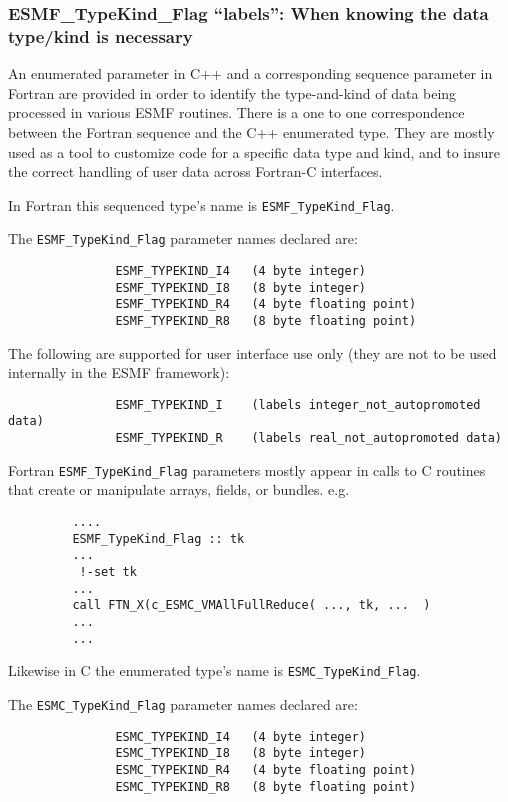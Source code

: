 \subsubsection{ESMF\_TypeKind\_Flag ``labels'': When knowing the data type/kind is necessary}

An enumerated parameter in C++ and a corresponding sequence parameter in Fortran are provided in order to identify the type-and-kind of data being processed in various ESMF routines. There is a one to one correspondence between the Fortran sequence and the C++ enumerated type. They are mostly used as a tool to customize code for a specific data type and kind, and to insure the correct handling of user data across Fortran-C interfaces.

In Fortran this sequenced type's name is {\tt ESMF\_TypeKind\_Flag}.

The {\tt ESMF\_TypeKind\_Flag} parameter names declared are:

\begin{verbatim}
               ESMF_TYPEKIND_I4   (4 byte integer)
               ESMF_TYPEKIND_I8   (8 byte integer)
               ESMF_TYPEKIND_R4   (4 byte floating point)
               ESMF_TYPEKIND_R8   (8 byte floating point)
\end{verbatim}

The following are supported for user interface use only (they are not to be used internally in the ESMF framework):
\begin{verbatim}
               ESMF_TYPEKIND_I    (labels integer_not_autopromoted data)
               ESMF_TYPEKIND_R    (labels real_not_autopromoted data)
\end{verbatim}

Fortran {\tt ESMF\_TypeKind\_Flag} parameters mostly appear in calls to C routines that create or manipulate arrays, fields, or bundles. e.g.
\begin{verbatim}
         ....
         ESMF_TypeKind_Flag :: tk
         ...
          !-set tk
         ...
         call FTN_X(c_ESMC_VMAllFullReduce( ..., tk, ...  )
         ...
         ...
\end{verbatim}
Likewise in C the enumerated type's name is {\tt ESMC\_TypeKind\_Flag}.

The {\tt ESMC\_TypeKind\_Flag} parameter names declared are:
\begin{verbatim}
               ESMC_TYPEKIND_I4   (4 byte integer)
               ESMC_TYPEKIND_I8   (8 byte integer)
               ESMC_TYPEKIND_R4   (4 byte floating point)
               ESMC_TYPEKIND_R8   (8 byte floating point)
\end{verbatim}

